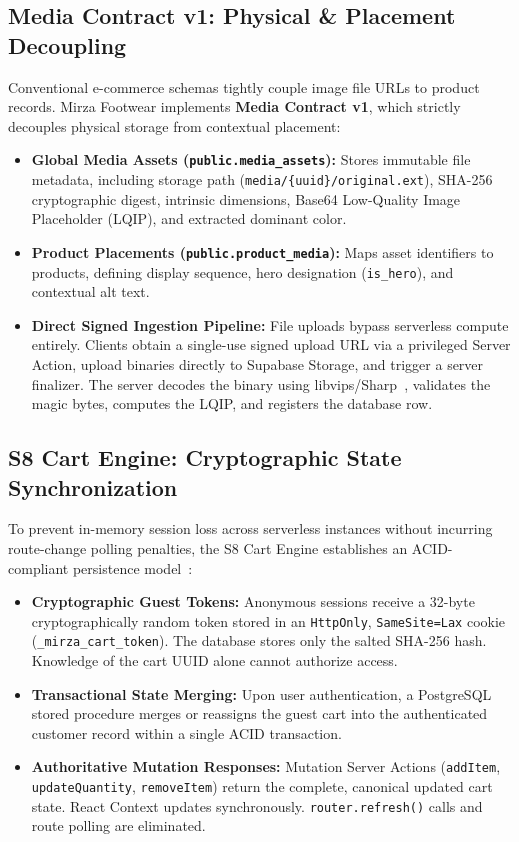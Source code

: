 \documentclass[conference]{IEEEtran}
\begin{document}
\subsection{Media Contract v1: Physical \& Placement Decoupling}
Conventional e-commerce schemas tightly couple image file URLs to product records. Mirza Footwear implements \textbf{Media Contract v1}, which strictly decouples physical storage from contextual placement:
\begin{itemize}
    \item \textbf{Global Media Assets (\texttt{public.media\_assets}):} Stores immutable file metadata, including storage path (\texttt{media/\{uuid\}/original.ext}), SHA-256 cryptographic digest, intrinsic dimensions, Base64 Low-Quality Image Placeholder (LQIP), and extracted dominant color.
    \item \textbf{Product Placements (\texttt{public.product\_media}):} Maps asset identifiers to products, defining display sequence, hero designation (\texttt{is\_hero}), and contextual alt text.
    \item \textbf{Direct Signed Ingestion Pipeline:} File uploads bypass serverless compute entirely. Clients obtain a single-use signed upload URL via a privileged Server Action, upload binaries directly to Supabase Storage, and trigger a server finalizer. The server decodes the binary using libvips/Sharp~\cite{libvips2020sharp}, validates the magic bytes, computes the LQIP, and registers the database row.
\end{itemize}

\subsection{S8 Cart Engine: Cryptographic State Synchronization}
To prevent in-memory session loss across serverless instances without incurring route-change polling penalties, the S8 Cart Engine establishes an ACID-compliant persistence model~\cite{dbacidthroughput2022}:
\begin{itemize}
    \item \textbf{Cryptographic Guest Tokens:} Anonymous sessions receive a 32-byte cryptographically random token stored in an \texttt{HttpOnly}, \texttt{SameSite=Lax} cookie (\texttt{\_mirza\_cart\_token}). The database stores only the salted SHA-256 hash. Knowledge of the cart UUID alone cannot authorize access.
    \item \textbf{Transactional State Merging:} Upon user authentication, a PostgreSQL stored procedure merges or reassigns the guest cart into the authenticated customer record within a single ACID transaction.
    \item \textbf{Authoritative Mutation Responses:} Mutation Server Actions (\texttt{addItem}, \texttt{updateQuantity}, \texttt{removeItem}) return the complete, canonical updated cart state. React Context updates synchronously. \texttt{router.refresh()} calls and route polling are eliminated.
\end{itemize}
\end{document}
